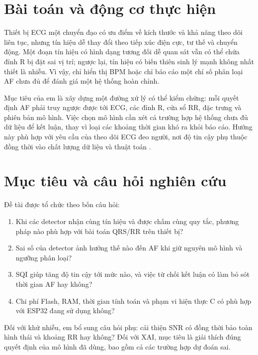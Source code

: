 \documentclass[12pt,a4paper,oneside]{report}
\begin{document}
\section{Bài toán và động cơ thực hiện}
Thiết bị ECG một chuyển đạo có ưu điểm về kích thước và khả năng theo dõi liên tục, nhưng tín hiệu dễ thay đổi theo tiếp xúc điện cực, tư thế và chuyển động. Một đoạn tín hiệu có hình dạng tương đối dễ quan sát vẫn có thể chứa đỉnh R bị đặt sai vị trí; ngược lại, tín hiệu có biến thiên sinh lý mạnh không nhất thiết là nhiễu. Vì vậy, chỉ hiển thị BPM hoặc chỉ báo cáo một chỉ số phân loại AF chưa đủ để đánh giá một hệ thống hoàn chỉnh.

Mục tiêu của em là xây dựng một đường xử lý có thể kiểm chứng: mỗi quyết định AF phải truy ngược được tới ECG, các đỉnh R, cửa sổ RR, đặc trưng và phiên bản mô hình. Việc chọn mô hình cần xét cả trường hợp hệ thống chưa đủ dữ liệu để kết luận, thay vì loại các khoảng thời gian khó ra khỏi báo cáo. Hướng này phù hợp với yêu cầu của theo dõi ECG đeo người, nơi độ tin cậy phụ thuộc đồng thời vào chất lượng dữ liệu và thuật toán \cite{smital2020,daluwatte2016}.

\section{Mục tiêu và câu hỏi nghiên cứu}
Đề tài được tổ chức theo bốn câu hỏi:
\begin{enumerate}
\item Khi các detector nhận cùng tín hiệu và được chấm cùng quy tắc, phương pháp nào phù hợp với bài toán QRS/RR trên thiết bị?
\item Sai số của detector ảnh hưởng thế nào đến AF khi giữ nguyên mô hình và ngưỡng phân loại?
\item SQI giúp tăng độ tin cậy tới mức nào, và việc từ chối kết luận có làm bỏ sót thời gian AF hay không?
\item Chi phí Flash, RAM, thời gian tính toán và phạm vi hiện thực C có phù hợp với ESP32 đang sử dụng không?
\end{enumerate}
Đối với khử nhiễu, em bổ sung câu hỏi phụ: cải thiện SNR có đồng thời bảo toàn hình thái và khoảng RR hay không? Đối với XAI, mục tiêu là giải thích đúng quyết định của mô hình đã dùng, bao gồm cả các trường hợp dự đoán sai.
\end{document}
